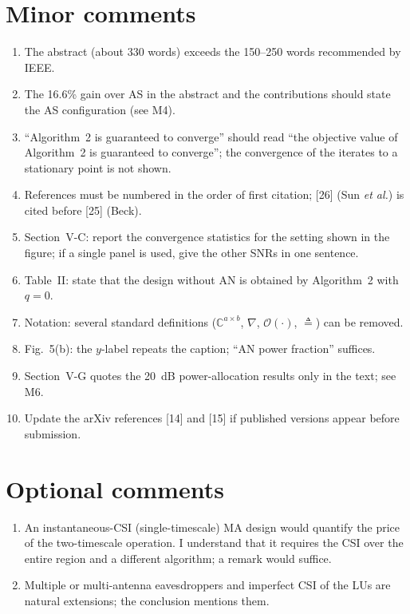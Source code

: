 \documentclass[10pt,a4paper]{article}
\begin{document}
\section{Minor comments}
\begin{enumerate}[label=m\arabic*.,leftmargin=*]
\item The abstract (about 330 words) exceeds the 150--250 words recommended by IEEE.
\item The 16.6\% gain over AS in the abstract and the contributions should state the AS configuration (see M4).
\item ``Algorithm~2 is guaranteed to converge'' should read ``the objective value of Algorithm~2 is guaranteed to converge''; the convergence of the iterates to a stationary point is not shown.
\item References must be numbered in the order of first citation; [26] (Sun \emph{et al.}) is cited before [25] (Beck).
\item Section~V-C: report the convergence statistics for the setting shown in the figure; if a single panel is used, give the other SNRs in one sentence.
\item Table~II: state that the design without AN is obtained by Algorithm~2 with $q=0$.
\item Notation: several standard definitions ($\mathbb C^{a\times b}$, $\nabla$, $\mathcal O(\cdot)$, $\triangleq$) can be removed.
\item Fig.~5(b): the $y$-label repeats the caption; ``AN power fraction'' suffices.
\item Section~V-G quotes the 20~dB power-allocation results only in the text; see M6.
\item Update the arXiv references [14] and [15] if published versions appear before submission.
\end{enumerate}

\section{Optional comments}
\begin{enumerate}[label=O\arabic*.,leftmargin=*]
\item An instantaneous-CSI (single-timescale) MA design would quantify the price of the two-timescale operation. I understand that it requires the CSI over the entire region and a different algorithm; a remark would suffice.
\item Multiple or multi-antenna eavesdroppers and imperfect CSI of the LUs are natural extensions; the conclusion mentions them.
\end{enumerate}
\end{document}
